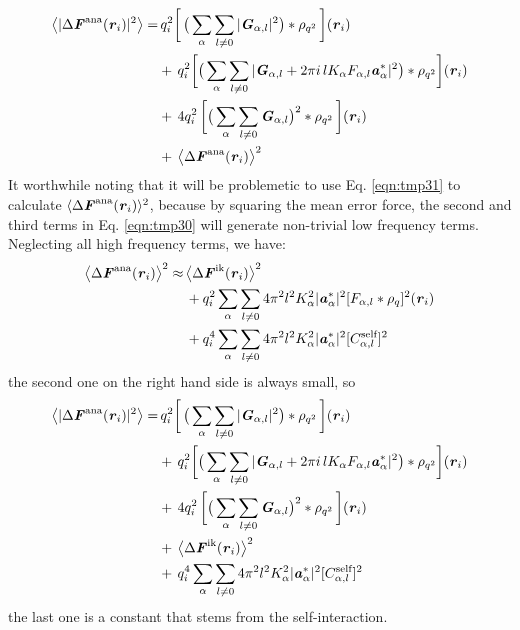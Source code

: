 \documentclass[aps,pre,preprint]{revtex4-1}
\renewcommand{\v}[1]{\textbf{\textit{#1}}}
\begin{document}
\begin{align}\nonumber
  \big\langle
  \vert \Delta\v F^{\textrm{ana}}(\v r_i)\vert^2
  \big\rangle
  =&\,
  q_i^2
  \bigg[\,
  \big(
  \sum_{\alpha} \sum_{l\neq 0}
  \vert \v G_{\alpha,l}\vert^2
  \big)
  \ast \rho_{q^2}
  \,\bigg] (\v r_i)\\\nonumber
  & +\,
  q_i^2
  \bigg[
  \big(
  \sum_{\alpha}\sum_{l\neq 0}
  \vert
  \v G_{\alpha,l} + 2\pi i\,l K_\alpha F_{\alpha,l} \v a_\alpha^\ast\vert^2
  \big)
  \ast \rho_{q^2}
  \bigg]
  (\v r_i) \\\nonumber
  & +\,
  4q_i^2\,
  \bigg[
  \big(
  \sum_{\alpha} \sum_{l\neq 0}  
  \v G_{\alpha,l}
  \big)^2
  \ast \rho_{q^2}\,
  \bigg] (\v r_i) \\
  & +\,
  \big\langle \Delta\v F^{\textrm{ana}}(\v r_i)\big\rangle ^2
\end{align}
It worthwhile noting that it will be problemetic to use
Eq. \eqref{eqn:tmp31} to calculate $\langle \Delta\v F^{\textrm{ana}}(\v r_i)\rangle
^2$, because by squaring the mean error force, the second and third
terms in Eq. \eqref{eqn:tmp30} will generate non-trivial low frequency
terms. Neglecting all high frequency terms, we have:
\begin{align}\nonumber
  \big\langle \Delta\v F^{\textrm{ana}}(\v r_i)\big\rangle ^2
  \approx&\,
  \big\langle \Delta\v F^{\textrm{ik}}(\v r_i)\big\rangle ^2 \\\nonumber
  &\,
  +q_i^2 \sum_{\alpha}\sum_{l\neq 0}
  4\pi^2l^2K_\alpha^2\vert\v a_{\alpha}^\ast\vert^2[F_{\alpha,l}\ast\rho_q]^2 (\v r_i) \\
  &\,
  +q_i^4 \sum_{\alpha}\sum_{l\neq 0}
  4\pi^2l^2K_\alpha^2\vert\v a_{\alpha}^\ast\vert^2[C_{\alpha,l}^{\textrm{self}}]^2 
\end{align}
the second one on the right hand side is always small, so
\begin{align}\nonumber
  \big\langle
  \vert \Delta\v F^{\textrm{ana}}(\v r_i)\vert^2
  \big\rangle
  =&\,
  q_i^2
  \bigg[\,
  \big(
  \sum_{\alpha} \sum_{l\neq 0}
  \vert \v G_{\alpha,l}\vert^2
  \big)
  \ast \rho_{q^2}
  \,\bigg] (\v r_i) \\\nonumber
  & +\,
  q_i^2
  \bigg[
  \big(
  \sum_{\alpha}\sum_{l\neq 0}
  \vert
  \v G_{\alpha,l} + 2\pi i\,l K_\alpha F_{\alpha,l} \v a_\alpha^\ast\vert^2
  \big)
  \ast \rho_{q^2}
  \bigg]
  (\v r_i) \\ \nonumber
  & +\,
  4q_i^2\,
  \bigg[
  \big(
  \sum_{\alpha} \sum_{l\neq 0}  
  \v G_{\alpha,l}
  \big)^2
  \ast \rho_{q^2}\,
  \bigg] (\v r_i) \\\nonumber
  & +\,
  \big\langle \Delta\v F^{\textrm{ik}}(\v r_i)\big\rangle ^2\\
  &+\,
  q_i^4 \sum_{\alpha}\sum_{l\neq 0}
  4\pi^2l^2K_\alpha^2\vert\v a_{\alpha}^\ast\vert^2[C_{\alpha,l}^{\textrm{self}}]^2 
\end{align}
the last one is a constant that stems from the self-interaction.
\end{document}
